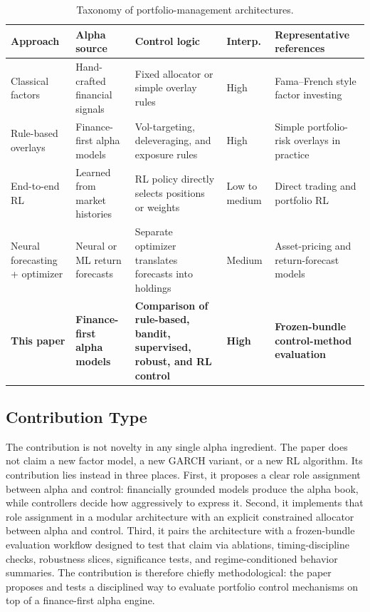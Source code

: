\documentclass[10pt,twocolumn]{article}
\begin{document}
\begin{table}[t]
\centering
\scriptsize
\caption{Taxonomy of portfolio-management architectures.}
\label{tab:taxonomy}
\begin{tabular}{@{} >{\raggedright\arraybackslash}p{2.1cm}
                >{\raggedright\arraybackslash}p{2.1cm}
                >{\raggedright\arraybackslash}p{2.15cm}
                >{\raggedright\arraybackslash}p{1.45cm}
                >{\raggedright\arraybackslash}p{4.2cm} @{}}
\toprule
\textbf{Approach} & \textbf{Alpha source} & \textbf{Control logic} & \textbf{Interp.} & \textbf{Representative references} \\
\midrule
Classical factors & Hand-crafted financial signals & Fixed allocator or simple overlay rules & High & Fama--French style factor investing \cite{fama1993} \\
Rule-based overlays & Finance-first alpha models & Vol-targeting, deleveraging, and exposure rules & High & Simple portfolio-risk overlays in practice \cite{almgren2000} \\
End-to-end RL & Learned from market histories & RL policy directly selects positions or weights & Low to medium & Direct trading and portfolio RL \cite{moody2001,jiang2017,zhang2020,cong2021} \\
Neural forecasting + optimizer & Neural or ML return forecasts & Separate optimizer translates forecasts into holdings & Medium & Asset-pricing and return-forecast models \cite{gu2020,chen2021,giglio2022} \\
\textbf{This paper} & \textbf{Finance-first alpha models} & \textbf{Comparison of rule-based, bandit, supervised, robust, and RL control} & \textbf{High} & \textbf{Frozen-bundle control-method evaluation} \\
\bottomrule
\end{tabular}
\end{table}

\subsection{Contribution Type}

The contribution is not novelty in any single alpha ingredient. The paper does
not claim a new factor model, a new GARCH variant, or a new RL algorithm. Its
contribution lies instead in three places. First, it proposes a clear role
assignment between alpha and control: financially grounded models produce the
alpha book, while controllers decide how aggressively to express it. Second, it
implements that role assignment in a modular architecture with an explicit
constrained allocator between alpha and control. Third, it pairs the
architecture with a frozen-bundle evaluation workflow designed to test that
claim via ablations, timing-discipline checks, robustness slices, significance
tests, and regime-conditioned behavior summaries. The contribution is therefore
chiefly methodological: the paper proposes and tests a disciplined way to
evaluate portfolio control mechanisms on top of a finance-first alpha engine.
\end{document}
